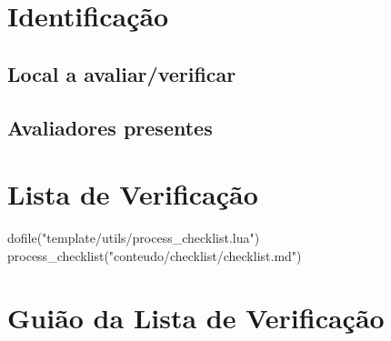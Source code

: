 %

\tableofcontents
\newpage

\section{Identificação}\label{sec:identificacao}

\subsection{Local a avaliar/verificar}\label{subsec:local-a-avaliar/verificar}



\subsection{Avaliadores presentes}\label{subsec:avaliadores-presentes}



\newpage

\section{Lista de Verificação}\label{sec:lista-de-verificacao}
\begin{small}
\begin{luacode}
dofile("template/utils/process_checklist.lua")
process_checklist("conteudo/checklist/checklist.md")
\end{luacode}
\end{small}
\newpage

\section{Guião da Lista de Verificação}\label{sec:guiao-da-lista-de-verificacao}
\newpage

\printbibliography[title={Referências}]
